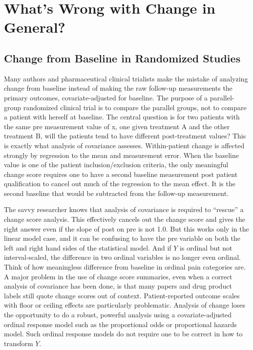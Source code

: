 \section{What's Wrong with Change in General?} 
\subsection{Change from Baseline in Randomized Studies} 
Many authors and pharmaceutical clinical trialists make the mistake of analyzing change from baseline instead of making the raw follow-up measurements the primary outcomes, covariate-adjusted for baseline.  The purpose of a parallel-group randomized clinical trial is to compare the parallel groups, not to compare a patient with herself at baseline. The central question is for two patients with the same pre measurement value of x, one given treatment A and the other treatment B, will the patients tend to have different post-treatment values? This is exactly what analysis of covariance assesses.  Within-patient change is affected strongly by regression to the mean and measurement error.  When the baseline value is one of the patient inclusion/exclusion criteria, the only meaningful change score requires one to have a second baseline measurement post patient qualification to cancel out much of the regression to the mean effect.  It is the second baseline that would be subtracted from the follow-up measurement.

The savvy researcher knows that analysis of covariance is required to ``rescue'' a change score analysis. This effectively cancels out the change score and gives the right answer even if the slope of post on pre is not 1.0. But this works only in the linear model case, and it can be confusing to have the pre variable on both the left and right hand sides of the statistical model. And if $Y$ is ordinal but not interval-scaled, the difference in two ordinal variables is no longer even ordinal.  Think of how meaningless difference from baseline in ordinal pain categories are. A major problem in the use of change score summaries, even when a correct analysis of covariance has been done, is that many papers and drug product labels still quote change scores out of context.  Patient-reported outcome scales with floor or ceiling effects are particularly problematic.  Analysis of change loses the opportunity to do a robust, powerful analysis using a covariate-adjusted ordinal response model such as the proportional odds or proportional hazards model.  Such ordinal response models do not require one to be correct in how to transform $Y$.


